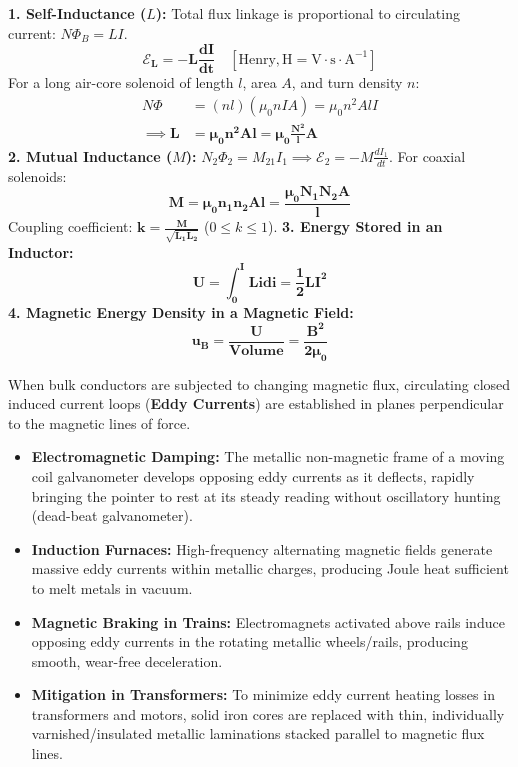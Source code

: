 \documentclass[10pt,twoside,openright]{book}
\begin{document}
\begin{formulabox}
\textbf{1. Self-Inductance ($L$):}
Total flux linkage is proportional to circulating current: $N \Phi_B = L I$.
\begin{equation}
  \mathbf{\mathcal{E}_L = -L \frac{dI}{dt}} \quad [\mathrm{Henry}, \mathrm{H} = \mathrm{V}\cdot\mathrm{s}\cdot\mathrm{A}^{-1}]
\end{equation}
For a long air-core solenoid of length $l$, area $A$, and turn density $n$:
\begin{align}
  N \Phi &= (n l)(\mu_0 n I A) = \mu_0 n^2 A l I \nonumber \\
  \implies \mathbf{L} &= \mathbf{\mu_0 n^2 A l = \mu_0 \frac{N^2}{l} A}
\end{align}
\textbf{2. Mutual Inductance ($M$):}
$N_2 \Phi_2 = M_{21} I_1 \implies \mathcal{E}_2 = -M \frac{dI_1}{dt}$. For coaxial solenoids:
\begin{equation}
  \mathbf{M = \mu_0 n_1 n_2 A l = \frac{\mu_0 N_1 N_2 A}{l}}
\end{equation}
Coupling coefficient: $\mathbf{k = \frac{M}{\sqrt{L_1 L_2}}}$ ($0 \le k \le 1$).
\textbf{3. Energy Stored in an Inductor:}
\begin{equation}
  \mathbf{U = \int_0^I L i di = \frac{1}{2} L I^2}
\end{equation}
\textbf{4. Magnetic Energy Density in a Magnetic Field:}
\begin{equation}
  \mathbf{u_B = \frac{U}{\text{Volume}} = \frac{B^2}{2\mu_0}}
\end{equation}
\end{formulabox}

\begin{ncertbox}
When bulk conductors are subjected to changing magnetic flux, circulating closed induced current loops (\textbf{Eddy Currents}) are established in planes perpendicular to the magnetic lines of force.
\begin{itemize}
  \item \textbf{Electromagnetic Damping:} The metallic non-magnetic frame of a moving coil galvanometer develops opposing eddy currents as it deflects, rapidly bringing the pointer to rest at its steady reading without oscillatory hunting (dead-beat galvanometer).
  \item \textbf{Induction Furnaces:} High-frequency alternating magnetic fields generate massive eddy currents within metallic charges, producing Joule heat sufficient to melt metals in vacuum.
  \item \textbf{Magnetic Braking in Trains:} Electromagnets activated above rails induce opposing eddy currents in the rotating metallic wheels/rails, producing smooth, wear-free deceleration.
  \item \textbf{Mitigation in Transformers:} To minimize eddy current heating losses in transformers and motors, solid iron cores are replaced with thin, individually varnished/insulated metallic laminations stacked parallel to magnetic flux lines.
\end{itemize}
\end{ncertbox}
\end{document}
